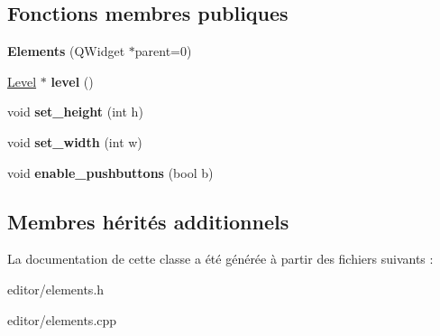 \subsection*{Fonctions membres publiques}
\begin{DoxyCompactItemize}
\item 
\hypertarget{classElements_a2b73500c747cc879fe708d35aba45532}{{\bfseries Elements} (Q\+Widget $\ast$parent=0)}\label{classElements_a2b73500c747cc879fe708d35aba45532}

\item 
\hypertarget{classElements_add91eac75df596342176acac4eb8b1a1}{\hyperlink{classLevel}{Level} $\ast$ {\bfseries level} ()}\label{classElements_add91eac75df596342176acac4eb8b1a1}

\item 
\hypertarget{classElements_a077b89b923b450bda172001121825e03}{void {\bfseries set\+\_\+height} (int h)}\label{classElements_a077b89b923b450bda172001121825e03}

\item 
\hypertarget{classElements_af6c7af0c40d3840296224453352fc534}{void {\bfseries set\+\_\+width} (int w)}\label{classElements_af6c7af0c40d3840296224453352fc534}

\item 
\hypertarget{classElements_ac8411c290c41dcb1777cb649155d3c04}{void {\bfseries enable\+\_\+pushbuttons} (bool b)}\label{classElements_ac8411c290c41dcb1777cb649155d3c04}

\end{DoxyCompactItemize}
\subsection*{Membres hérités additionnels}


La documentation de cette classe a été générée à partir des fichiers suivants \+:\begin{DoxyCompactItemize}
\item 
editor/elements.\+h\item 
editor/elements.\+cpp\end{DoxyCompactItemize}
